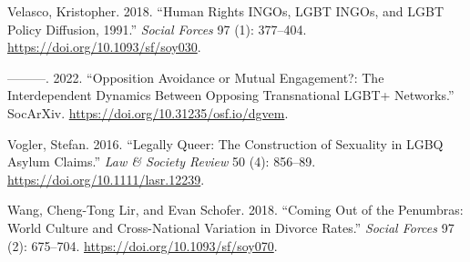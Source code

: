 \documentclass[
  12pt,
]{article}
\newlength{\cslhangindent}
\newlength{\cslentryspacingunit} %
\newenvironment{CSLReferences}[2] %
 {%
  \setlength{\parindent}{0pt}
  \ifodd #1
  \let\oldpar\par
  \def\par{\hangindent=\cslhangindent\oldpar}
  \fi
  \setlength{\parskip}{#2\cslentryspacingunit}
 }%
 {}
\begin{document}
\begin{CSLReferences}{1}{0}
\leavevmode{}%
Velasco, Kristopher. 2018. {``Human {Rights INGOs}, {LGBT INGOs}, and {LGBT Policy Diffusion}, 1991.''} \emph{Social Forces} 97 (1): 377--404. \url{https://doi.org/10.1093/sf/soy030}.

\leavevmode{}%
---------. 2022. {``Opposition {Avoidance} or {Mutual Engagement}?: {The Interdependent Dynamics Between Opposing Transnational LGBT}+ {Networks}.''} {SocArXiv}. \url{https://doi.org/10.31235/osf.io/dgvem}.

\leavevmode{}%
Vogler, Stefan. 2016. {``Legally {Queer}: {The Construction} of {Sexuality} in {LGBQ Asylum Claims}.''} \emph{Law \& Society Review} 50 (4): 856--89. \url{https://doi.org/10.1111/lasr.12239}.

\leavevmode{}%
Wang, Cheng-Tong Lir, and Evan Schofer. 2018. {``Coming {Out} of the {Penumbras}: {World Culture} and {Cross-National Variation} in {Divorce Rates}.''} \emph{Social Forces} 97 (2): 675--704. \url{https://doi.org/10.1093/sf/soy070}.

\end{CSLReferences}
\end{document}
